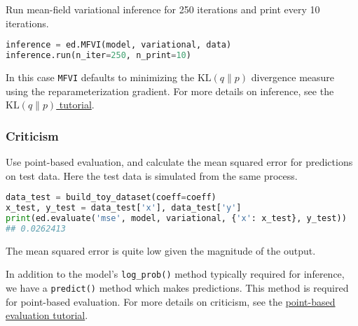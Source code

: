 Run mean-field variational inference for 250 iterations and print
every 10 iterations.
\begin{lstlisting}[language=Python]
inference = ed.MFVI(model, variational, data)
inference.run(n_iter=250, n_print=10)
\end{lstlisting}
In this case \texttt{MFVI} defaults to minimizing the
$\text{KL}(q\|p)$ divergence measure using the reparameterization
gradient.
For more details on inference, see the \href{tut_KLqp.html}{$\text{KL}(q\|p)$ tutorial}.


\subsubsection{Criticism}

Use point-based evaluation, and calculate the mean squared
error for predictions on test data. Here the test data is simulated
from the same process.

\begin{lstlisting}[language=Python]
data_test = build_toy_dataset(coeff=coeff)
x_test, y_test = data_test['x'], data_test['y']
print(ed.evaluate('mse', model, variational, {'x': x_test}, y_test))
## 0.0262413
\end{lstlisting}

The mean squared error is quite low given the magnitude of the output.

In addition to the model's \texttt{log_prob()} method typically required for
inference, we have a \texttt{predict()} method which makes
predictions. This method is required for point-based evaluation. For
more details on criticism, see the \href{tut_point_eval.html}{point-based
evaluation tutorial}.
